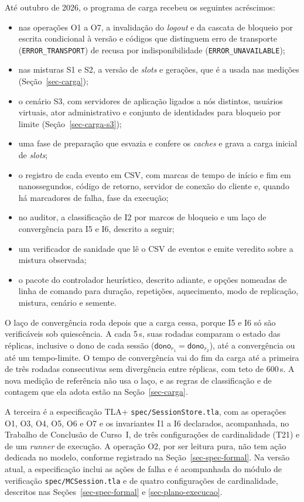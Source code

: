 Até outubro de 2026, o programa de carga recebeu os seguintes acréscimos:

\begin{itemize}
    \item nas operações O1 a O7, a invalidação do \emph{logout} e da cascata de bloqueio por escrita condicional à versão e códigos que distinguem erro de transporte (\texttt{ERROR\_TRANSPORT}) de recusa por indisponibilidade (\texttt{ERROR\_UNAVAILABLE});
    \item nas misturas S1 e S2, a versão de \emph{slots} e gerações, que é a usada nas medições (Seção~\ref{sec-carga});
    \item o cenário S3, com servidores de aplicação ligados a nós distintos, usuários virtuais, ator administrativo e conjunto de identidades para bloqueio por limite (Seção~\ref{sec-carga-s3});
    \item uma fase de preparação que esvazia e confere os \emph{caches} e grava a carga inicial de \emph{slots};
    \item o registro de cada evento em CSV, com marcas de tempo de início e fim em nanossegundos, código de retorno, servidor de conexão do cliente e, quando há marcadores de falha, fase da execução;
    \item no auditor, a classificação de I2 por marcos de bloqueio e um laço de convergência para I5 e I6, descrito a seguir;
    \item um verificador de sanidade que lê o CSV de eventos e emite veredito sobre a mistura observada;
    \item o pacote do controlador heurístico, descrito adiante, e opções nomeadas de linha de comando para duração, repetições, aquecimento, modo de replicação, mistura, cenário e semente.
\end{itemize}

O laço de convergência roda depois que a carga cessa, porque I5 e I6 só são verificáveis sob quiescência. A cada 5\,s, suas rodadas comparam o estado das réplicas, inclusive o dono de cada sessão ($\textsf{dono}_{r_1} = \textsf{dono}_{r_2}$), até a convergência ou até um tempo-limite. O tempo de convergência vai do fim da carga até a primeira de três rodadas consecutivas sem divergência entre réplicas, com teto de 600\,s. A nova medição de referência não usa o laço, e as regras de classificação e de contagem que ela adota estão na Seção~\ref{sec-carga}.

A terceira é a especificação TLA+ \texttt{spec/SessionStore.tla}, com as operações O1, O3, O4, O5, O6 e O7 e os invariantes I1 a I6 declarados, acompanhada, no Trabalho de Conclusão de Curso~I, de três configurações de cardinalidade (T21) e de um \emph{runner} de execução. A operação O2, por ser leitura pura, não tem ação dedicada no modelo, conforme registrado na Seção~\ref{sec-spec-formal}. Na versão atual, a especificação inclui as ações de falha e é acompanhada do módulo de verificação \texttt{spec/MCSession.tla} e de quatro configurações de cardinalidade, descritos nas Seções~\ref{sec-spec-formal} e \ref{sec-plano-execucao}.

